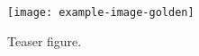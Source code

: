 

\begin{figure}[!ht]
\begin{center}
\texttt{[image: example-image-golden]}
\end{center}
\caption{Teaser figure.}
\label{ch2:fig:1-1}
\end{figure}
